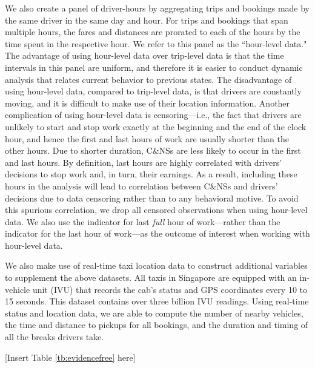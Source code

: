 \documentclass[reviewmode]{restud}
\begin{document}
We also create a panel of driver-hours by aggregating trips and bookings made by the same driver in the same day and hour. For trips and bookings that span multiple hours, the fares and distances are prorated to each of the hours by the time spent in the respective hour. We refer to this panel as the ``hour-level data." The advantage of using hour-level data over trip-level data is that the time intervals in this panel are uniform, and therefore it is easier to conduct dynamic analysis that relates current behavior to previous states. The disadvantage of using hour-level data, compared to trip-level data, is that drivers are constantly moving, and it is difficult to make use of their location information. Another complication of using hour-level data is censoring---i.e., the fact that drivers are unlikely to start and stop work exactly at the beginning and the end of the clock hour, and hence the first and last hours of work are usually shorter than the other hours. Due to shorter duration, C\&NSs are less likely to occur in the first and last hours. By definition, last hours are highly correlated with drivers' decisions to stop work and, in turn, their earnings. As a result, including these hours in the analysis will lead to correlation between C\&NSs and drivers' decisions due to data censoring rather than to any behavioral motive. To avoid this spurious correlation, we drop all censored observations when using hour-level data. We also use the indicator for last \emph{full} hour of work---rather than the indicator for the last hour of work---as the outcome of interest when working with hour-level data.

We also make use of real-time taxi location data to construct additional variables to supplement the above datasets. All taxis in Singapore are equipped with an in-vehicle unit (IVU) that records the cab's status and GPS coordinates every 10 to 15 seconds. This dataset contains over three billion IVU readings. Using real-time status and location data, we are able to compute the number of nearby vehicles, the time and distance to pickups for all bookings, and the duration and timing of all the breaks drivers take.

\begin{center}
	[Insert Table \ref{tb:evidencefree} here]
\end{center}
\end{document}
